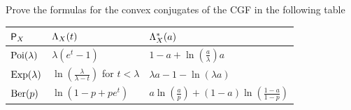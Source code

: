 
\begin{exercise}[subtitle={Convex conjugate calculations \Coffeecup}]
    \label{ex: convex conjugate calculations}
    Prove the formulas for the convex conjugates of the CGF in the following
    table
    \begin{center}
    \def\arraystretch{1.2}
    \begin{tabular}{l l l}
        \toprule
        \(\mathsf{P}_X\)
        &  \(\Lambda_X(t)\) & \(\Lambda_X^*(a)\)
        \\
        \midrule
        \(\mathrm{Poi}(\lambda)\)
        & \(\lambda (e^{t} - 1)\)
        & \(1-a + \ln(\frac{a}\lambda)a\) 
        \\
        \(\mathrm{Exp}(\lambda)\)
        & \(\ln(\frac{\lambda}{\lambda - t})\) for \(t < \lambda\)
        & \(\lambda a -1 - \ln(\lambda a)\)
        \\
        \(\mathrm{Ber}(p)\)
        & \(\ln(1 - p + p e^{t})\)
        & \(a\ln(\frac{a}p) + (1-a)\ln(\frac{1-a}{1-p})\)
        \\
        \bottomrule
    \end{tabular}
    \end{center}
\end{exercise}

